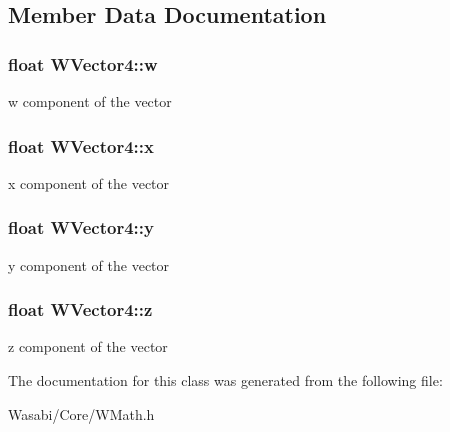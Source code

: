 \subsection{Member Data Documentation}
\subsubsection[{\texorpdfstring{w}{w}}]{\setlength{\rightskip}{0pt plus 5cm}float W\+Vector4\+::w}\hypertarget{class_w_vector4_a05c1aefe5406d5e72298452f7ca4c1b8}{}\label{class_w_vector4_a05c1aefe5406d5e72298452f7ca4c1b8}
w component of the vector 
\subsubsection[{\texorpdfstring{x}{x}}]{\setlength{\rightskip}{0pt plus 5cm}float W\+Vector4\+::x}\hypertarget{class_w_vector4_a855b484722da51ff1ecdab2524f194df}{}\label{class_w_vector4_a855b484722da51ff1ecdab2524f194df}
x component of the vector 
\subsubsection[{\texorpdfstring{y}{y}}]{\setlength{\rightskip}{0pt plus 5cm}float W\+Vector4\+::y}\hypertarget{class_w_vector4_a22ff2849429e14a11ce1d4aeffd47eeb}{}\label{class_w_vector4_a22ff2849429e14a11ce1d4aeffd47eeb}
y component of the vector 
\subsubsection[{\texorpdfstring{z}{z}}]{\setlength{\rightskip}{0pt plus 5cm}float W\+Vector4\+::z}\hypertarget{class_w_vector4_ac3ec3a5457109c11558dc4fbebb072b4}{}\label{class_w_vector4_ac3ec3a5457109c11558dc4fbebb072b4}
z component of the vector 

The documentation for this class was generated from the following file\+:\begin{DoxyCompactItemize}
\item 
Wasabi/\+Core/W\+Math.\+h\end{DoxyCompactItemize}
